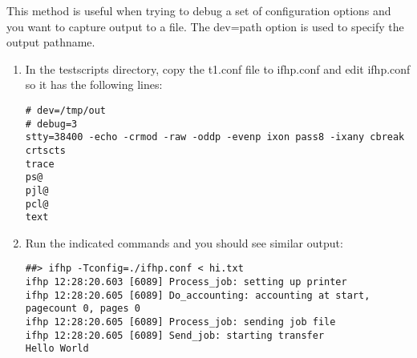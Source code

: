 \documentclass[a4paper]{article}
\begin{document}
This method is useful when trying to debug a set of configuration
options and you want to capture output to a file.
The
{\ttfamily dev=path}
option is used to specify the output pathname.
\begin{enumerate}
\item In the
{\ttfamily testscripts}
directory,
copy the
{\ttfamily t1.conf}
file to
{\ttfamily ifhp.conf}
and edit 
{\ttfamily ifhp.conf}
so it has the following lines:
\begin{tscreen}
\begin{verbatim}
# dev=/tmp/out
# debug=3
stty=38400 -echo -crmod -raw -oddp -evenp ixon pass8 -ixany cbreak crtscts
trace
ps@ 
pjl@
pcl@
text
\end{verbatim}
\end{tscreen}
\item Run the indicated commands and you should see similar output:
\begin{tscreen}
\begin{verbatim}
##> ifhp -Tconfig=./ifhp.conf < hi.txt
ifhp 12:28:20.603 [6089] Process_job: setting up printer
ifhp 12:28:20.605 [6089] Do_accounting: accounting at start, pagecount 0, pages 0
ifhp 12:28:20.605 [6089] Process_job: sending job file
ifhp 12:28:20.605 [6089] Send_job: starting transfer
Hello World


\end{verbatim}
\end{tscreen}
\end{enumerate}
\end{document}
